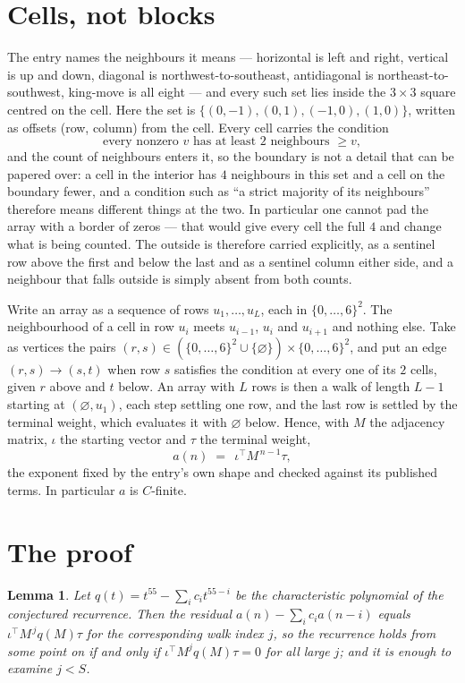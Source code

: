 \documentclass[11pt,a4paper]{article}
\theoremstyle{plain}
\newtheorem{lemma}[theorem]{Lemma}
\theoremstyle{definition}
\begin{document}
\section{Cells, not blocks}

The entry names the neighbours it means --- horizontal is left and right, vertical is up and
down, diagonal is northwest-to-southeast, antidiagonal is northeast-to-southwest, king-move is
all eight --- and every such set lies inside the $3\times3$ square centred on the cell. Here
the set is $\{(0,-1), (0,1), (-1,0), (1,0)\}$, written as offsets (row, column) from the cell. Every cell carries
the condition
\[
\text{every nonzero }v\text{ has at least 2 neighbours }\ge v,
\]
and the count of neighbours enters it, so the boundary is not a detail that can be papered
over: a cell in the interior has $4$ neighbours in this set and a cell on the boundary
fewer, and a condition such as ``a strict majority of its neighbours'' therefore means
different things at the two. In particular one cannot pad the array with a border of zeros ---
that would give every cell the full $4$ and change what is being counted. The outside is
therefore carried
explicitly, as a sentinel row above the first and below the last and as a sentinel column
either side, and a neighbour that falls outside is simply absent from both counts.

Write an array as a sequence of rows $u_1,\dots,u_L$, each in
$\{0,\dots,6\}^{2}$. The neighbourhood of a cell in row $u_i$ meets $u_{i-1}$,
$u_i$ and $u_{i+1}$ and nothing else. Take as vertices the pairs
$(r,s)\in(\{0,\dots,6\}^{2}\cup\{\varnothing\})\times\{0,\dots,6\}^{2}$,
and put an edge $(r,s)\to(s,t)$ when row $s$ satisfies the condition at every one of its
$2$ cells, given $r$ above and $t$ below. An array with $L$ rows is then a walk of length
$L-1$ starting at $(\varnothing,u_1)$, each step settling one row, and the last row is
settled by the terminal weight, which evaluates it with $\varnothing$ below. Hence,
with $M$ the adjacency matrix, $\iota$ the starting vector and $\tau$ the terminal weight,
\[
a(n)\;=\;\,\iota^{\!\top}M^{\,n-1}\tau ,
\]
the exponent fixed by the entry's own shape and checked against its published terms. In
particular $a$ is $C$-finite.

\section{The proof}

\begin{lemma}\label{lem:crit}
Let $q(t)=t^{55}-\sum_i c_it^{55-i}$ be the characteristic polynomial of the
conjectured recurrence. Then the residual $a(n)-\sum_ic_ia(n-i)$ equals
$\iota^{\!\top}M^{\,j}q(M)\tau$ for the corresponding walk index $j$, so the
recurrence holds from some point on if and only if $\iota^{\!\top}M^{j}q(M)\tau=0$ for all
large $j$; and it is enough to examine $j<S$.
\end{lemma}
\end{document}
